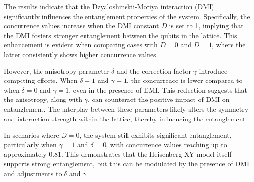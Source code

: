 The results indicate that the Dzyaloshinskii-Moriya interaction (DMI) significantly influences the entanglement properties of the 
system. Specifically, the concurrence values increase when the DMI constant \(D\) is set to 1, implying that the DMI fosters 
stronger entanglement between the qubits in the lattice. This enhancement is evident when comparing cases with \(D = 0\) and 
\(D = 1\), where the latter consistently shows higher concurrence values.

However, the anisotropy parameter \(\delta\) and the correction factor \(\gamma\) introduce competing effects. When 
\(\delta = 1\) and \(\gamma = 1\), the concurrence is lower compared to when \(\delta = 0\) and \(\gamma = 1\), even 
in the presence of DMI. This reduction suggests that the anisotropy, along with \(\gamma\), can counteract the positive 
impact of DMI on entanglement. The interplay between these parameters likely alters the symmetry and interaction strength
within the lattice, thereby influencing the entanglement.

In scenarios where \(D = 0\), the system still exhibits significant entanglement, particularly when 
\(\gamma = 1\) and \(\delta = 0\), with concurrence values reaching up to approximately 0.81. 
This demonstrates that the Heisenberg XY model itself supports strong entanglement, but this can be 
modulated by the presence of DMI and adjustments to \(\delta\) and \(\gamma\).




